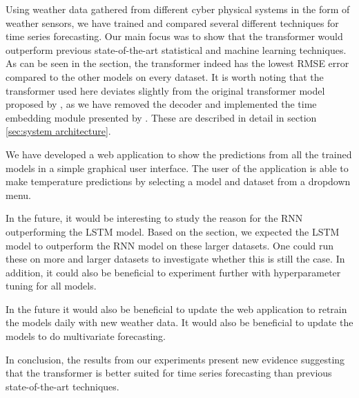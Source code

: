 Using weather data gathered from different cyber physical systems in the form of weather sensors, we have trained and compared several different techniques for time series forecasting.
Our main focus was to show that the transformer would outperform previous state-of-the-art statistical and machine learning techniques.
As can be seen in the  section, the transformer indeed has the lowest RMSE error compared to the other models on every dataset. 
It is worth noting that the transformer used here deviates slightly from the original transformer model proposed by \citet{AttentionIsAllYouNeed}, as we have removed the decoder and implemented the time embedding module presented by \citet{time2vec}.
These are described in detail in section \ref{sec:system architecture}.

We have developed a web application to show the predictions from all the trained models in a simple graphical user interface. 
The user of the application is able to make temperature predictions by selecting a model and dataset from a dropdown menu. 

In the future, it would be interesting to study the reason for the RNN outperforming the LSTM model.
Based on the  section, we expected the LSTM model to outperform the RNN model on these larger datasets.
One could run these on more and larger datasets to investigate whether this is still the case. 
In addition, it could also be beneficial to experiment further with hyperparameter tuning for all models.

In the future it would also be beneficial to update the web application to retrain the models daily with new weather data. It would also be beneficial to update the models to do multivariate forecasting.

In conclusion, the results from our experiments present new evidence suggesting that the transformer is better suited for time series forecasting than previous state-of-the-art techniques.
